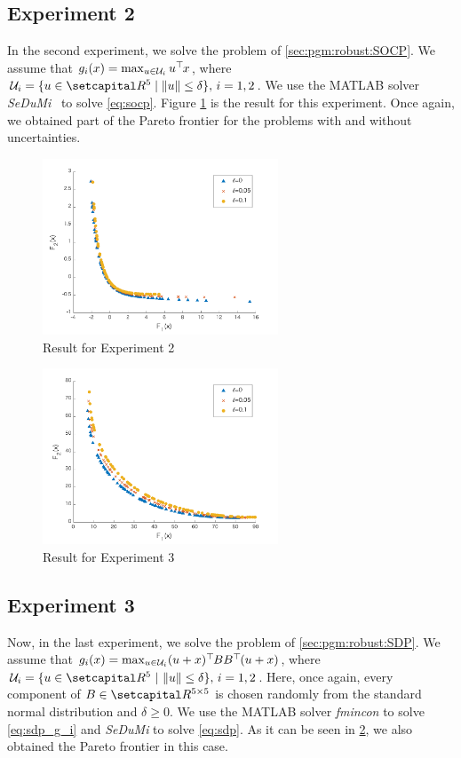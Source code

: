 \documentclass[../main]{subfiles}
\begin{document}
\subsection*{Experiment 2}
In the second experiment, we solve the problem of \cref{sec:pgm:robust:SOCP}. We assume that $g_i(x) = \max_{u \in \mathcal{U}_i } u^\top\hspace{-1pt} x$, where $\mathcal{U}_i = \{u \in \setR^5 \mid \|u\| \leq \delta \},\, i = 1, 2$. We use the MATLAB solver \emph{SeDuMi}~\cite{Sturm1999} to solve \cref{eq:socp}. Figure \ref{fig:experiment2} is the result for this experiment. Once again, we obtained part of the Pareto frontier for the problems with and without uncertainties.
\begin{figure}[htbp]
\centering
\includegraphics[clip, width = 7.0cm]{figs/linear_ellipsoid_without_line_search}
\caption{Result for Experiment 2}
\label{fig:experiment2}
\end{figure}
\begin{figure}[thbp]
\centering
\includegraphics[clip, width = 7.0cm]{figs/quadratic_ellipsoid_without_line_search}
\caption{Result for Experiment 3}
\label{fig:experiment3}
\end{figure}
\subsection*{Experiment 3}
Now, in the last experiment, we solve the problem of \cref{sec:pgm:robust:SDP}. We assume that $g_i(x) = \max_{u \in \mathcal{U}_i } (u + x)^\top\hspace{-1pt} B B^\top\hspace{-1pt} (u + x)$, where $\mathcal{U}_i = \{u \in \setR^5\ | \  \|u\| \leq \delta \},\, i = 1, 2$. Here, once again, every component of $B \in \setR^{5 \times 5}$ is chosen randomly from the standard normal distribution and $\delta \geq 0$. We use the MATLAB solver \emph{fmincon} to solve \cref{eq:sdp_g_i} and \emph{SeDuMi} to solve \cref{eq:sdp}. As it can be seen in \cref{fig:experiment3}, we also obtained the Pareto frontier in this case.
\end{document}
